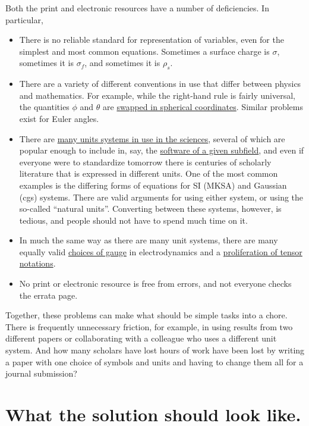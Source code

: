 \documentclass[12pt,letterpaper]{article}
\begin{document}
Both the print and electronic resources have a number of deficiencies. In particular,
\begin{itemize}
\item There is no reliable standard for representation of variables, even for the simplest and most common equations. Sometimes a surface charge is $\sigma$, sometimes it is $\sigma_f$, and sometimes it is $\rho_s$.
\item There are a variety of different conventions in use that differ between physics and mathematics. For example, while the right-hand rule is fairly universal, the quantities $\phi$ and $\theta$ are \href{http://mathworld.wolfram.com/SphericalCoordinates.html}{swapped in spherical coordinates}. Similar problems exist for Euler angles.
\item There are \href{https://en.wikipedia.org/wiki/Systems_of_units}{many units systems in use in the sciences}, several of which are popular enough to include in, say, the \href{http://lammps.sandia.gov/doc/units.html}{software of a given subfield}, and even if everyone were to standardize tomorrow there is centuries of scholarly literature that is expressed in different units. One of the most common examples is the differing forms of equations for SI (MKSA) and Gaussian (cgs) systems. There are valid arguments for using either system, or using the so-called ``natural units''. Converting between these systems, however, is tedious, and people should not have to spend much time on it.
\item In much the same way as there are many unit systems, there are many equally valid \href{https://en.wikipedia.org/wiki/Gauge_fixing}{choices of gauge} in electrodynamics and a \href{https://en.wikipedia.org/wiki/Tensor_notation}{proliferation of tensor notations}.
\item No print or electronic resource is free from errors, and not everyone checks the errata page.
\end{itemize}

Together, these problems can make what should be simple tasks into a chore. There is frequently unnecessary friction, for example, in using results from two different papers or collaborating with a colleague who uses a different unit system. And how many scholars have lost hours of work have been lost by writing a paper with one choice of symbols and units and having to change them all for a journal submission?

\section{What the solution should look like.}
\end{document}
